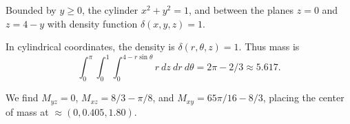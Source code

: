 {
Bounded by $y\geq 0$, the cylinder $x^2+y^2=1$, and between the planes $z=0$ and $z=4-y$ with density function $\delta(x,y,z) =1$. 
}
{In cylindrical coordinates, the density is $\delta(r,\theta,z) = 1$. Thus mass is
$$\int_0^{\pi}\int_0^1\int_0^{4-r\sin\theta} r\ dz\ dr\ d\theta = 2\pi-2/3\approx 5.617.$$

We find $M_{yz} = 0$, $M_{xz} = 8/3-\pi/8$, and $M_{xy} = 65\pi/16-8/3$, placing the center of mass at $\approx (0,0.405,1.80)$.
}
